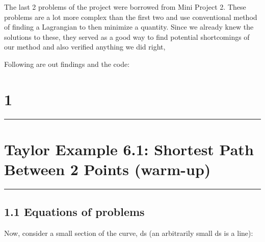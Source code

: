 \documentclass[hidelinks, 11pt]{article}
\begin{document}
The last 2 problems of the project were borrowed from Mini Project 2. These problems are a lot more complex than the first two and use conventional method of finding a Lagrangian to then minimize a quantity. Since we already knew the solutions to these, they served as a good way to find potential shortcomings of our method and also verified anything we did right, 

Following are out findings and the code:

\newpage

\begin{center}
  \section*{1}
  \noindent\rule{16cm}{0.4pt}
  \section*{Taylor Example 6.1: Shortest Path Between 2 Points (warm-up)} %
  \noindent\rule{16cm}{0.4pt}
\end{center}

\subsection*{1.1 Equations of problems}

\begin{center}
\end{center}


\noindent Now, consider a small section of the curve, ds (an arbitrarily small ds is a line):

\begin{center}
\end{center}
\end{document}
